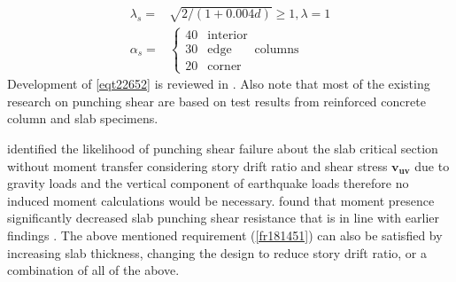 \begin{equation}\nonumber\begin{array}{rl}
\lambda_s =& \sqrt{{2}/({1+0.004d})}\ge1, \lambda = 1\\
\alpha_s =&\left\{\begin{array}{ll}40&\mathrm{interior}\\ 30& \mathrm{edge}\\20&\mathrm{corner}\end{array}\right.\,\mathrm{columns}
\end{array}
\end{equation}
Development of \ref{eqt22652} is reviewed in \cite{bayrak2009two}. Also note that most of the existing research on punching shear are based on test results from reinforced concrete column and slab specimens.



\cite{megally2002,moehle1996,kang2006,kang2007} identified the likelihood of punching shear failure about the slab critical section without moment transfer considering story drift ratio and shear stress $\mathbf{v_{uv}}$ due to gravity loads and the vertical component of earthquake loads therefore no induced moment calculations would be necessary. \cite{megally2000,kang2009nonlinear,moreno2008punching,song2012effective,kruger1998punching,krueger1999influence} found that moment presence significantly decreased slab punching shear resistance  that is in line with earlier findings \citep{hawkins1974,islam1976}. The above mentioned requirement (\ref{fr181451}) can also be satisfied by increasing slab thickness, changing the design to reduce story drift ratio, or a combination of all of the above. 
    
